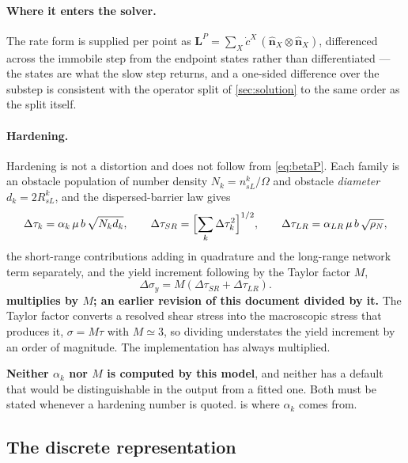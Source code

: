 \documentclass{article}
\begin{document}
\paragraph{Where it enters the solver.} The rate form is supplied per point as
$\bm L^{P}=\sum_X\dot c^X\,(\hat{\bm n}_X\!\otimes\!\hat{\bm n}_X)$, differenced
across the immobile step from the endpoint states rather than differentiated ---
the states are what the slow step returns, and a one-sided difference over the
substep is consistent with the operator split of \cref{sec:solution} to the same
order as the split itself.

\paragraph{Hardening.} Hardening is not a distortion and does not follow from
\cref{eq:betaP}. Each family is an obstacle population of number density
$N_k=n^k_{sL}/\Omega$ and obstacle \emph{diameter} $d_k=2R^k_{sL}$, and the
dispersed-barrier law gives
\begin{equation}
  \Delta\tau_k=\alpha_k\,\mu\,b\,\sqrt{N_kd_k},
  \qquad
  \Delta\tau_{SR}=\Bigl[\sum_k\Delta\tau_k^{2}\Bigr]^{1/2},
  \qquad
  \Delta\tau_{LR}=\alpha_{LR}\,\mu\,b\,\sqrt{\rho_N},
  \label{eq:dispersed}
\end{equation}
the short-range contributions adding in quadrature and the long-range network
term separately, and the yield increment following by the Taylor factor $M$,
\begin{equation}
  \Delta\sigma_y=M\left(\Delta\tau_{SR}+\Delta\tau_{LR}\right).
  \label{eq:taylor}
\end{equation}
\textbf{ multiplies by $M$; an earlier revision of this document
divided by it.} The Taylor factor converts a resolved shear stress into the
macroscopic stress that produces it, $\sigma=M\tau$ with $M\simeq3$, so dividing
understates the yield increment by an order of magnitude. The implementation has
always multiplied.

\textbf{Neither $\alpha_k$ nor $M$ is computed by this model}, and neither has a
default that would be distinguishable in the output from a fitted one. Both must
be stated whenever a hardening number is quoted.  is where
$\alpha_k$ comes from.

\subsection{The discrete representation}
\label{sec:obs-discrete}
\end{document}
